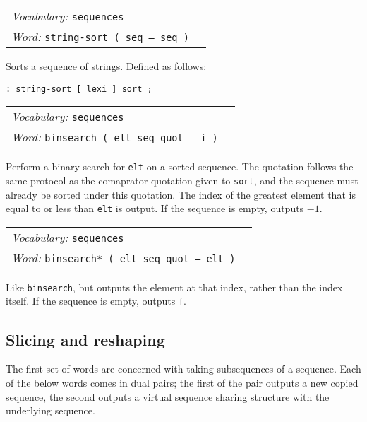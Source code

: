 \documentclass{book}
\newcommand{\vocabulary}[1]{\emph{Vocabulary:} \texttt{#1}&\\}
\newcommand{\ordinaryword}[2]{\index{\texttt{#1}}\emph{Word:} \texttt{#2}&\\}
\newcommand{\wordtable}[1]{


\begin{tabularx}{12cm}{lX}
\hline
#1
\hline
\end{tabularx}

}
\begin{document}
\wordtable{
\vocabulary{sequences}
\ordinaryword{string-sort}{string-sort~( seq -- seq )}
}
Sorts a sequence of strings. Defined as follows:
\begin{verbatim}
: string-sort [ lexi ] sort ;
\end{verbatim}

\wordtable{
\vocabulary{sequences}
\ordinaryword{binsearch}{binsearch~( elt seq quot -- i )}
}
Perform a binary search for \verb|elt| on a sorted sequence. The quotation follows the same protocol as the comaprator quotation given to \verb|sort|, and the sequence must already be sorted under this quotation. The index of the greatest element that is equal to or less than \verb|elt| is output. If the sequence is empty, outputs $-1$.

\wordtable{
\vocabulary{sequences}
\ordinaryword{binsearch*}{binsearch*~( elt seq quot -- elt )}
}
Like \verb|binsearch|, but outputs the element at that index, rather than the index itself. If the sequence is empty, outputs \verb|f|.

\subsection{Slicing and reshaping}\label{reshaping}

The first set of words are concerned with taking subsequences of a sequence. Each of the below words comes in dual pairs; the first of the pair outputs a new copied sequence, the second outputs a virtual sequence sharing structure with the underlying sequence.
\end{document}
